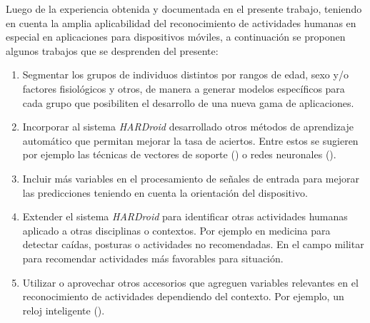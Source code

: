 \label{sec82:trabajos-futuros}Luego de la experiencia obtenida y
documentada en el presente trabajo, teniendo en cuenta la amplia aplicabilidad
del reconocimiento de actividades humanas en especial en aplicaciones
para dispositivos móviles, a continuación se proponen algunos trabajos
que se desprenden del presente:
\begin{enumerate}
\item Segmentar los grupos de individuos distintos por rangos de edad, sexo
y/o factores fisiológicos y otros, de manera a generar modelos específicos
para cada grupo que posibiliten el desarrollo de una nueva gama de
aplicaciones. 
\item Incorporar al sistema \emph{HARDroid} desarrollado otros métodos de
aprendizaje automático que permitan mejorar la tasa de aciertos. Entre
estos se sugieren por ejemplo las técnicas de vectores de soporte
() o redes neuronales ().
\item Incluir más variables en el procesamiento de señales de entrada para
mejorar las predicciones teniendo en cuenta la orientación del dispositivo. 
\item Extender el sistema \emph{HARDroid} para identificar otras actividades
humanas aplicado a otras disciplinas o contextos. Por ejemplo en medicina
para detectar caídas, posturas o actividades no recomendadas. En el
campo militar para recomendar actividades más favorables para situación.
\item Utilizar o aprovechar otros accesorios que agreguen variables relevantes
en el reconocimiento de actividades dependiendo del contexto. Por
ejemplo, un reloj inteligente (\emph{}).
\end{enumerate}

